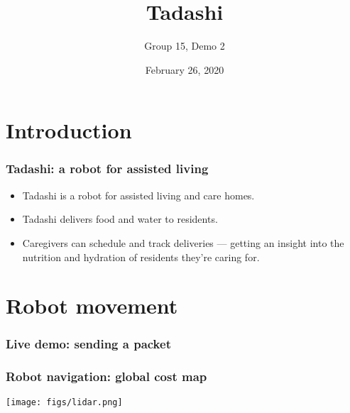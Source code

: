 \documentclass{beamer}
\title{Tadashi}
\subtitle{Group 15, Demo 2}
\institute{\vspace{2em}\texttt{[image: figs/logo.png]}}
\date{February 26, 2020}
\begin{document}
\maketitle
\section{Introduction}
\begin{frame}
  \frametitle{Tadashi: a robot for assisted living}
  \begin{itemize}
    \item Tadashi is a robot for assisted living and care homes.
    \item Tadashi delivers food and water to residents.
    \item Caregivers can schedule and track deliveries --- getting an insight into the nutrition and hydration of residents they're caring for.
  \end{itemize}
\end{frame}

\section{Robot movement}
\begin{frame}
  \frametitle{Live demo: sending a packet}
\end{frame}

\begin{frame}
  \frametitle{Robot navigation: global cost map}
  \begin{center}
    \texttt{[image: figs/lidar.png]}
  \end{center}
\end{frame}
\end{document}

